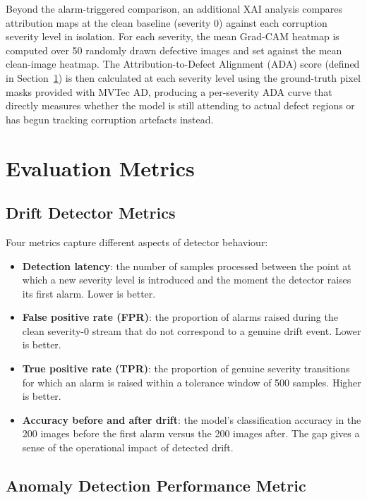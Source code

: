 Beyond the alarm-triggered comparison, an additional XAI analysis compares attribution maps at the clean baseline (severity 0) against each corruption severity level in isolation. For each severity, the mean Grad-CAM heatmap is computed over 50 randomly drawn defective images and set against the mean clean-image heatmap. The Attribution-to-Defect Alignment (ADA) score (defined in Section~\ref{sec:evaluation}) is then calculated at each severity level using the ground-truth pixel masks provided with MVTec AD, producing a per-severity ADA curve that directly measures whether the model is still attending to actual defect regions or has begun tracking corruption artefacts instead.

\section{Evaluation Metrics}
\label{sec:evaluation}

\subsection{Drift Detector Metrics}

Four metrics capture different aspects of detector behaviour:

\begin{itemize}
  \item \textbf{Detection latency}: the number of samples processed between the point at which a new severity level is introduced and the moment the detector raises its first alarm. Lower is better.
  \item \textbf{False positive rate (FPR)}: the proportion of alarms raised during the clean severity-0 stream that do not correspond to a genuine drift event. Lower is better.
  \item \textbf{True positive rate (TPR)}: the proportion of genuine severity transitions for which an alarm is raised within a tolerance window of 500 samples. Higher is better.
  \item \textbf{Accuracy before and after drift}: the model's classification accuracy in the 200 images before the first alarm versus the 200 images after. The gap gives a sense of the operational impact of detected drift.
\end{itemize}

\subsection{Anomaly Detection Performance Metric}

